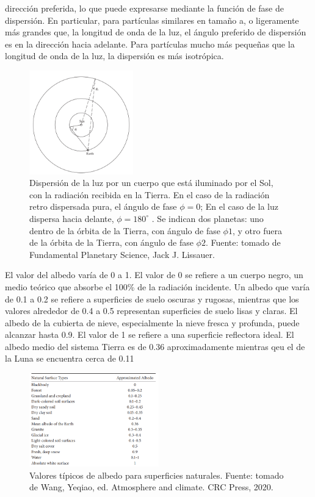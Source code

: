 \documentclass[12pt]{article}
\begin{document}
dirección preferida, lo que puede expresarse mediante la función de fase de dispersión. En particular, para 
partículas similares en tamaño a, o ligeramente más grandes que, la longitud de onda de la luz, el ángulo preferido 
de dispersión es en la dirección hacia adelante. Para partículas mucho más pequeñas que la longitud de onda de la luz, 
la dispersión es más isotrópica.
\begin{figure}[H]
    \centering
    \includegraphics[width=0.4\textwidth]{images/albedo_sol_reflejo.png}
    \caption{Dispersión de la luz por un cuerpo que está iluminado por el Sol, con la radiación recibida en la 
    Tierra. En el caso de la radiación retro dispersada pura, el ángulo de fase $\phi = 0$; En el caso de la luz 
    dispersa hacia delante, $\phi= 180^\circ$ . Se indican dos planetas: uno dentro de la órbita de la Tierra, 
    con ángulo de fase $\phi1$, y otro fuera de la órbita de la Tierra, con ángulo de fase $\phi2$.
    Fuente: tomado de Fundamental Planetary Science, Jack J. Lissauer.}
    \label{fig:albedo_Reflejo}
\end{figure}
El valor del albedo varía de 0 a 1. El valor de 0 se refiere a un cuerpo negro, un medio teórico que absorbe el 
100\% de la radiación incidente. Un albedo que varía de 0.1 a 0.2 se refiere a superficies de suelo oscuras y rugosas, 
mientras que los valores alrededor de 0.4 a 0.5 representan superficies de suelo lisas y claras. El albedo de la 
cubierta de nieve, especialmente la nieve fresca y profunda, puede alcanzar hasta 0.9. El valor de 1 se refiere a 
una superficie reflectora ideal. El albedo medio del sistema Tierra es de 0.36 aproximadamente mientras qeu el de la Luna 
se encuentra cerca de 0.11 \parencite{wang2020atmosphere}
\begin{figure}[H]
    \centering
    \includegraphics[width=0.5\textwidth]{images/Albedo.png}
    \caption{Valores típicos de albedo para superficies naturales.
    Fuente: tomado de Wang, Yeqiao, ed. Atmosphere and climate. CRC Press, 2020.}
    \label{fig:albedo_valores}
\end{figure}
\end{document}
